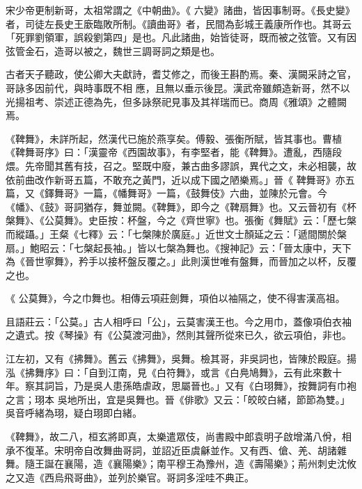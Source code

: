 \begin{pinyinscope}
 宋少帝更制新哥，太祖常謂之《中朝曲》。《
 六變》諸曲，皆因事制哥。《長史變》者，司徒左長史王廞臨敗所制。《讀曲哥》者，民間為彭城王義康所作也。其哥云「死罪劉領軍，誤殺劉第四」是也。凡此諸曲，始皆徒哥，既而被之弦管。又有因弦管金石，造哥以被之，魏世三調哥詞之類是也。



 古者天子聽政，使公卿大夫獻詩，耆艾修之，而後王斟酌焉。秦、漢闕采詩之官，哥詠多因前代，與時事既不相
 應，且無以垂示後昆。漢武帝雖頗造新哥，然不以光揚祖考、崇述正德為先，但多詠祭祀見事及其祥瑞而已。商周《雅頌》之體闕焉。



 《鞞舞》，未詳所起，然漢代已施於燕享矣。傅毅、張衡所賦，皆其事也。曹植《鞞舞哥序》曰：「漢靈帝《西園故事》，有李堅者，能《鞞舞》。遭亂，西隨段煨。先帝聞其舊有技，召之。堅既中廢，兼古曲多謬誤，異代之文，未必相襲，故依前曲改作新哥五篇，不敢充之黃門，近以成下國之陋樂焉。」晉《
 鞞舞哥》亦五篇，又《鐸舞哥》一篇，《幡舞哥》一篇，《鼓舞伎》六曲，並陳於元會。今《幡》、《鼓》哥詞猶存，舞並闕。《鞞舞》，即今之《鞞扇舞》也。又云晉初有《杯槃舞》、《公莫舞》。史臣按：杯盤，今之《齊世寧》也。張衡《舞賦》云：「歷七槃而縱躡。」王粲《七釋》云：「七槃陳於廣庭。」近世文士顏延之云：「遞間關於槃扇。」鮑昭云：「七槃起長袖。」皆以七槃為舞也。《搜神記》云：「晉太康中，天下為《晉世寧舞》，矜手以接杯盤反覆之。」此則漢世唯有盤舞，而晉加之以杯，反覆之也。



 《
 公莫舞》，今之巾舞也。相傳云項莊劍舞，項伯以袖隔之，使不得害漢高祖。



 且語莊云：「公莫。」古人相呼曰「公」，云莫害漢王也。今之用巾，蓋像項伯衣袖之遺式。按《琴操》有《公莫渡河曲》，然則其聲所從來已久，欲云項伯，非也。



 江左初，又有《拂舞》。舊云《拂舞》，吳舞。檢其哥，非吳詞也，皆陳於殿庭。揚泓《拂舞序》曰：「自到江南，見《白符舞》，或言《白鳧鳩舞》，云有此來數十年。察其詞旨，乃是吳人患孫皓虐政，思屬晉也。」又有《白珝舞》，按舞詞有巾袍之言；珝本
 吳地所出，宜是吳舞也。晉《俳歌》又云：「皎皎白緒，節節為雙。」吳音呼緒為珝，疑白珝即白緒。



 《鞞舞》，故二八，桓玄將即真，太樂遣眾伎，尚書殿中郎袁明子啟增滿八佾，相承不復革。宋明帝自改舞曲哥詞，並詔近臣虞龢並作。又有西、傖、羌、胡諸雜舞。隨王誕在襄陽，造《襄陽樂》；南平穆王為豫州，造《壽陽樂》；荊州刺史沈攸之又造《西烏飛哥曲》，並列於樂官。哥詞多淫哇不典正。




\end{pinyinscope}
